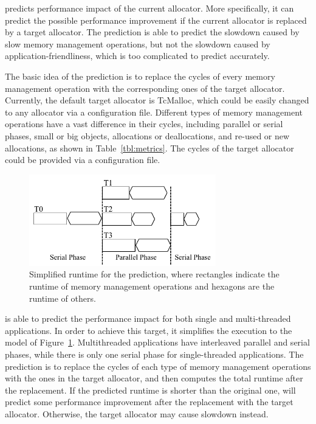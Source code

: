 \MP{} predicts performance impact of the current allocator. More specifically, it can predict the possible performance improvement if the current allocator is replaced by a target allocator. The prediction is able to predict the slowdown caused by slow memory management operations, but not the slowdown caused by application-friendliness, which is too complicated to predict accurately. 

The basic idea of the prediction is to replace the cycles of every memory management operation with the corresponding ones of the target allocator. Currently, the default target allocator is TcMalloc, which could be easily changed to any allocator via a configuration file. Different types of memory management operations have a vast difference in their cycles, including parallel or serial phases, small or big objects, allocations or deallocations, and re-used or new allocations, as shown in Table~\ref{tbl:metrics}. The cycles of the target allocator could be provided via a configuration file. 

 



\begin{figure}[!ht]
\centering
\includegraphics[width=3.2in]{figures/forkjoin}
\caption{Simplified runtime for the prediction, where rectangles indicate the runtime of memory management operations and hexagons are the runtime of others. \label{fig:time}}
\end{figure}

\MP{} is able to predict the performance impact for both single and multi-threaded applications. In order to achieve this target, it simplifies the execution to the model of Figure~\ref{fig:time}. Multithreaded applications have interleaved parallel and serial phases, while there is only one serial phase for single-threaded applications. The prediction is to replace the cycles of each type of memory management operations with the ones in the target allocator, and then computes the total runtime after the replacement. If the predicted runtime is shorter than the original one, \MP{} will predict some performance improvement after the replacement with the target allocator. Otherwise, the target allocator may cause slowdown instead. 

